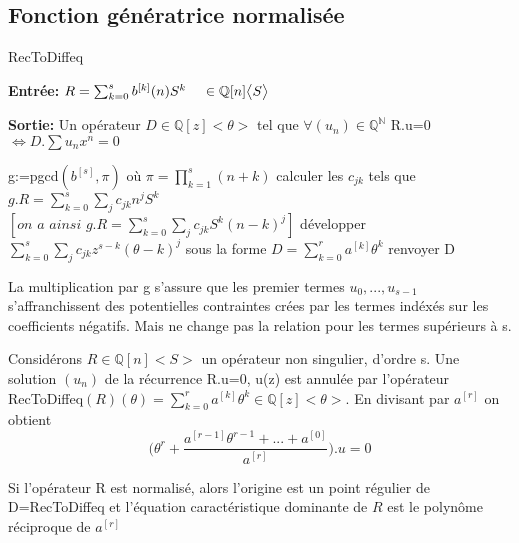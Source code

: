 \documentclass[a4paper,10.5pt]{article}
\begin{document}
	\subsection{Fonction génératrice normalisée}
	
	\begin{algorithm}
		\caption{RecToDiffeq}
		
		\vspace{2mm}
		
		\textbf{Entrée:} $R=\sum_{k=0}^{s} b^{[k]}(n)S^{k} \hspace{4mm} \in \mathbb{Q}[n]\big<S\big>$
		
		\textbf{Sortie:} Un opérateur $D \in \mathbb{Q}[z] \big<\theta\big>$ tel que $\forall (u_{n}) \in \mathbb{Q}^{\mathbb{N}}$ R.u=0 $\iff D.\sum u_{n}x^{n}=0$ 
		
		\begin{algorithmic}[1]
			\vspace{3mm}
			\STATE g:=pgcd$(b^{[s]},\pi)$ où $\pi=\prod_{k=1}^{s}(n+k)$
			\vspace{3mm}
			\STATE calculer les $c_{jk}$ tels que $g.R=\sum_{k=0}^{s}\sum_{j}c_{jk}n^{j}S^{k}$\\
			\vspace{3mm}
			$[\textit{on a ainsi } g.R=\sum_{k=0}^{s}\sum_{j}c_{jk}S^{k}(n-k)^{j}]$
			\vspace{3mm}
			\STATE développer $\sum_{k=0}^{s}\sum_{j} c_{jk}z^{s-k}(\theta-k)^{j}$ sous la forme $D=\sum_{k=0}^{r} a^{[k]}\theta^{k}$
			\vspace{3mm}
			\STATE renvoyer D
		\end{algorithmic}
		
	\end{algorithm}
	La multiplication par g s'assure que les premier termes $u_{0},...,u_{s-1}$
	s'affranchissent des potentielles contraintes crées par les termes indéxés sur les coefficients négatifs. Mais ne change pas la relation pour les termes supérieurs à s.
	
	Considérons $R \in \mathbb{Q}[n]\big< S\big>$ un opérateur non singulier, d'ordre s. Une solution $(u_{n})$ de la récurrence R.u=0, u(z) est annulée par l'opérateur RecToDiffeq$(R)(\theta)=\sum_{k=0}^{r}a^{[k]}\theta^{k} \in \mathbb{Q}[z]\big< \theta\big>$. En divisant par $a^{[r]}$ on obtient
	\begin{equation}
	\big(\theta^{r}+\frac{a^{[r-1]}\theta^{r-1}+...+a^{[0]}}{a^{[r]}}\big).u=0
	\end{equation}

	
	\begin{proposition}Si l'opérateur R est normalisé, alors l'origine est un point régulier de D=RecToDiffeq et l'équation caractéristique dominante de $R$ est le polynôme réciproque de $a^{[r]}$ 
	\end{proposition}
	
\end{document}
